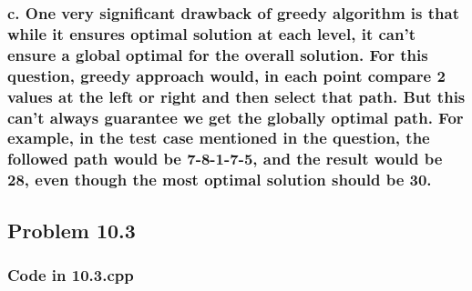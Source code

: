 \documentclass[a4paper,12pt]{article}
\begin{document}
\subsubsection*{\textnormal {c. One very significant drawback of greedy algorithm is that while it ensures optimal solution at each level, it can't ensure a global optimal for the overall solution. For this question, greedy approach would, in each point compare 2 values at the left or right and then select that path. But this can't always guarantee we get the globally optimal path. For example, in the test case mentioned in the question, the followed path would be 7-8-1-7-5, and the result would be 28, even though the most optimal solution should be 30. } }

\subsection* { Problem 10.3 \newline}
\subsubsection*{\textnormal { Code in 10.3.cpp }}
\end{document}
